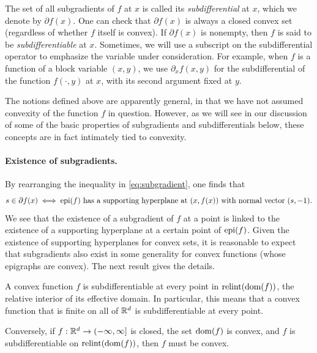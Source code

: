 The set of all subgradients of $f$ at $x$ is called its \emph{subdifferential}
at $x$, which we denote by $\partial f(x)$. One can check that $\partial f(x)$
is always a closed convex set (regardless of whether $f$ itself is convex).  If
$\partial f(x)$ is nonempty, then $f$ is said to be \emph{subdifferentiable} at
$x$. Sometimes, we will use a subscript on the subdifferential operator to
emphasize the variable under consideration. For example, when $f$ is a function 
of a block variable $(x,y)$, we use $\partial_x f(x,y)$ for the subdifferential
of the function $f(\cdot, y)$ at $x$, with its second argument fixed at $y$.

The notions defined above are apparently general, in that we have not assumed 
convexity of the function $f$ in question. However, as we will see in our 
discussion of some of the basic properties of subgradients and subdifferentials
below, these concepts are in fact intimately tied to convexity.   

\paragraph{Existence of subgradients.}

By rearranging the inequality in \eqref{eq:subgradient}, one finds that 
\[
s \in \partial f(x) \iff \text{$\operatorname{epi}(f)$ has a supporting hyperplane at
  $(x, f(x))$ with normal vector $(s, -1)$.}
\]
We see that the existence of a subgradient of $f$ at a point is linked to the
existence of a supporting hyperplane at a certain point of $\operatorname{epi}(f)$. Given the
existence of supporting hyperplanes for convex sets, it is reasonable to expect
that subgradients also exist in some generality for convex functions (whose
epigraphs are convex). The next result gives the details.

\begin{Theorem}
\label{thm:subgradient_existence}
A convex function $f$ is subdifferentiable at every point in $\operatorname{relint}(\operatorname{dom}(f))$,
the relative interior of its effective domain. In particular, this means that a
convex function that is finite on all of $\mathbb{R}^d$ is subdifferentiable at every
point.   

\setlength{\parindent}{\normalparindent}
Conversely, if $f : \mathbb{R}^d \to (-\infty, \infty]$ is closed, the set $\operatorname{dom}(f)$ is
convex, and $f$ is subdifferentiable on $\operatorname{relint}(\operatorname{dom}(f))$, then $f$ must be
convex.          
\end{Theorem}

